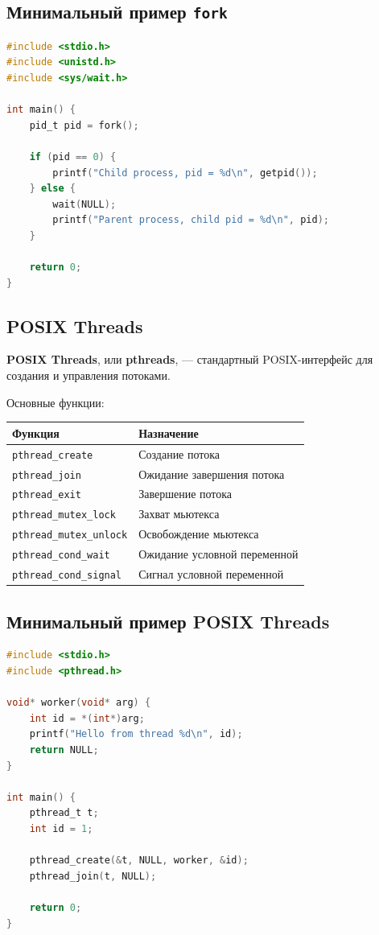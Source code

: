 \documentclass[12pt,a4paper]{article}
\begin{document}
\subsection{Минимальный пример \texttt{fork}}

\begin{lstlisting}[language=C]
#include <stdio.h>
#include <unistd.h>
#include <sys/wait.h>

int main() {
    pid_t pid = fork();

    if (pid == 0) {
        printf("Child process, pid = %d\n", getpid());
    } else {
        wait(NULL);
        printf("Parent process, child pid = %d\n", pid);
    }

    return 0;
}
\end{lstlisting}

\subsection{POSIX Threads}

\textbf{POSIX Threads}, или \textbf{pthreads}, --- стандартный POSIX-интерфейс для создания и управления потоками.

Основные функции:
\begin{center}
\begin{tabular}{|p{5cm}|p{9cm}|}
\hline
\textbf{Функция} & \textbf{Назначение} \\
\hline
\texttt{pthread\_create} & Создание потока \\
\hline
\texttt{pthread\_join} & Ожидание завершения потока \\
\hline
\texttt{pthread\_exit} & Завершение потока \\
\hline
\texttt{pthread\_mutex\_lock} & Захват мьютекса \\
\hline
\texttt{pthread\_mutex\_unlock} & Освобождение мьютекса \\
\hline
\texttt{pthread\_cond\_wait} & Ожидание условной переменной \\
\hline
\texttt{pthread\_cond\_signal} & Сигнал условной переменной \\
\hline
\end{tabular}
\end{center}

\subsection{Минимальный пример POSIX Threads}

\begin{lstlisting}[language=C]
#include <stdio.h>
#include <pthread.h>

void* worker(void* arg) {
    int id = *(int*)arg;
    printf("Hello from thread %d\n", id);
    return NULL;
}

int main() {
    pthread_t t;
    int id = 1;

    pthread_create(&t, NULL, worker, &id);
    pthread_join(t, NULL);

    return 0;
}
\end{lstlisting}
\end{document}
